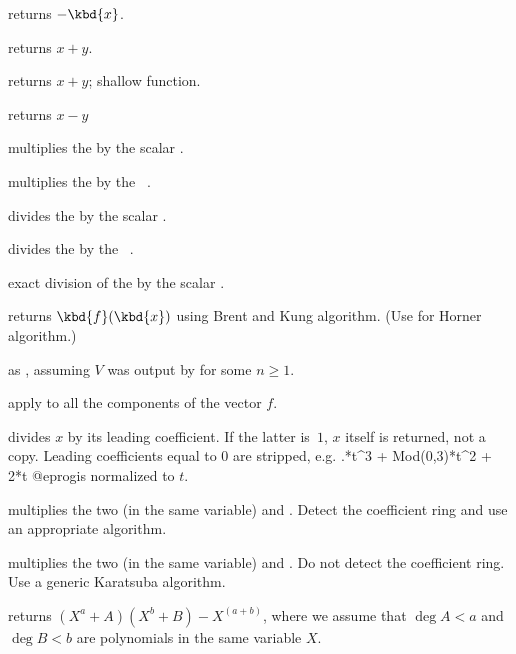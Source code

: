  returns $-\kbd{x}$.

 returns $x+y$.

 returns $x+y$; shallow function.


 returns $x-y$

 multiplies the  
by the scalar .

 multiplies the  
by the ~.

 divides the  
by the scalar .

 divides the  
by the ~.

 exact division of the 
 by the scalar .

 returns $\kbd{f}(\kbd{x})$ using
Brent and Kung algorithm. (Use  for Horner algorithm.)

 as ,
assuming $V$ was output by  for some $n\geq 1$.

 apply 
to all the components of the vector $f$.

 divides $x$ by its
leading coefficient. If the latter is~$1$, $x$ itself is returned, not a
copy. Leading coefficients equal to $0$ are stripped, e.g.
.*t^3 + Mod(0,3)*t^2 + 2*t
@eprog\noindent is normalized to $t$.

 multiplies the two  (in the same
variable)  and . Detect the coefficient ring and use an
appropriate algorithm.

 multiplies the two  (in the same
variable)  and . Do not detect the coefficient ring.
Use a generic Karatsuba algorithm.

returns $(X^a + A)(X^b + B) - X^(a+b)$, where we assume that $\deg A < a$
and $\deg B < b$ are polynomials in the same variable $X$.


